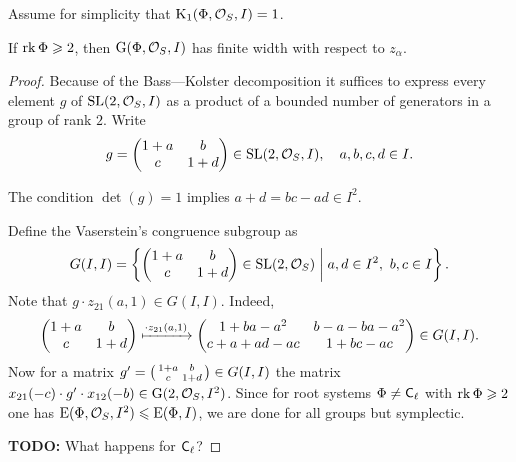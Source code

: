 Assume for simplicity that $\operatorname{K}_1(\Phi,\mathcal{O}_S,I)=1$.
\begin{lemma}
If $\operatorname{rk}\Phi\geqslant2$, then $\operatorname{G}(\Phi,\mathcal{O}_S,I)$ has finite width with respect to $z_\alpha$.
\end{lemma}
\begin{proof}
Because of the Bass---Kolster decomposition it suffices to express every element $g$ of $\operatorname{SL}(2,\mathcal{O}_S,I)$ as a product of a bounded number of generators in a group of rank $2$. Write
\[ g=\begin{pmatrix}1+a & b \\ c & 1+d\end{pmatrix}\in\operatorname{SL}(2,\mathcal{O}_S,I),\quad a,b,c,d\in I. \]

The condition $\det(g)=1$ implies $a+d=bc-ad\in I^2$.

Define the Vaserstein's congruence subgroup as
\[ G(I,I)=\left\{ \begin{pmatrix}1+a & b \\ c & 1+d\end{pmatrix}\in\SL(2,\mathcal{O}_S)\;\middle|\; a,d\in I^2,\ b,c\in I \right\}. \]
Note that $g\cdot z_{21}(a,1)\in G(I,I)$. Indeed,
\[
\begin{pmatrix}
1+a & b \\ c & 1+d
\end{pmatrix} \xmapsto{\cdot z_{21}(a,1)}
\begin{pmatrix}
1+ba-a^2 & b-a-ba-a^2 \\ c+a+ad-ac & 1+bc-ac
\end{pmatrix} \in G(I,I).
\]
Now for a matrix $g'=\begin{psmallmatrix}1+a & b \\ c & 1+d\end{psmallmatrix}\in G(I,I)$ the matrix $x_{21}(-c)\cdot g'\cdot x_{12}(-b)\in\operatorname{G}(2,\mathcal{O}_S,I^2)$. Since for root systems $\Phi\neq\mathsf{C}_\ell$ with $\operatorname{rk}\Phi\geqslant2$ one has $\operatorname{E}(\Phi,\mathcal{O}_S,I^2)\leqslant\operatorname{E}(\Phi,I)$, we are done for all groups but symplectic.

\textbf{TODO:} What happens for $\mathsf{C}_\ell$?
\end{proof}